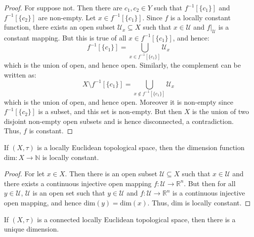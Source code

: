         \begin{proof}
            For suppose not. Then there are $c_{1},c_{2}\in{Y}$ such that
            $f^{\minus{1}}[\{c_{1}\}]$ and $f^{\minus{1}}[\{c_{2}\}]$ are
            non-empty. Let $x\in{f}^{\minus{1}}[\{c_{1}\}]$. Since $f$ is a
            locally constant function, there exists an open subset
            $\mathcal{U}_{x}\subseteq{X}$ such that $x\in\mathcal{U}$ and
            $f|_{\mathcal{U}}$ is a constant mapping. But this is true of all
            $x\in{f}^{\minus{1}}[\{c_{1}\}]$, and hence:
            \begin{equation}
                f^{\minus{1}}[\{c_{1}\}]=
                    \bigcup_{x\in{f}^{\minus{1}}[\{c_{1}\}]}\mathcal{U}_{x}
            \end{equation}
            which is the union of open, and hence open. Similarly, the
            complement can be written as:
            \begin{equation}
                X\setminus{f}^{\minus{1}}[\{c_{1}\}]=
                    \bigcup_{x\notin{f}^{\minus{1}}[\{c_{1}\}]}\mathcal{U}_{x}
            \end{equation}
            which is the union of open, and hence open. Moreover it is non-empty
            since $f^{\minus{1}}[\{c_{2}\}]$ is a subset, and this set is
            non-empty. But then $X$ is the union of two disjoint non-empty open
            subsets and is hence disconnected, a contradiction. Thus, $f$ is
            constant.
        \end{proof}
        \begin{theorem}
            If $(X,\tau)$ is a locally Euclidean topological space, then the
            dimension function $\textrm{dim}:X\rightarrow\mathbb{N}$ is locally
            constant.
        \end{theorem}
        \begin{proof}
            For let $x\in{X}$. Then there is an open subset
            $\mathcal{U}\subseteq{X}$ such that $x\in\mathcal{U}$ and
            there exists a continuous injective open mapping
            $f:\mathcal{U}\rightarrow\mathbb{R}^{n}$. But then for all
            $y\in\mathcal{U}$, $\mathcal{U}$ is an open set such that
            $y\in\mathcal{U}$ and $f:\mathcal{U}\rightarrow\mathbb{R}^{n}$ is a
            continuous injective open mapping, and hence
            $\textrm{dim}(y)=\textrm{dim}(x)$. Thus, $\textrm{dim}$ is locally
            constant.
        \end{proof}
        \begin{theorem}
            If $(X,\tau)$ is a connected locally Euclidean topological space,
            then there is a unique dimension.
        \end{theorem}
